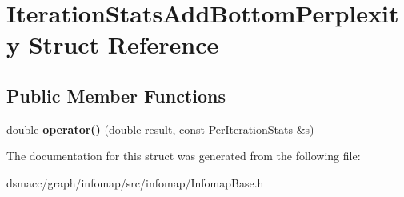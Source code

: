 \hypertarget{structIterationStatsAddBottomPerplexity}{}\section{Iteration\+Stats\+Add\+Bottom\+Perplexity Struct Reference}
\label{structIterationStatsAddBottomPerplexity}
\subsection*{Public Member Functions}
\begin{DoxyCompactItemize}
\item 
\mbox{\label{structIterationStatsAddBottomPerplexity_a26080c94aaecb0580364a8b902a0e9cc}} 
double {\bfseries operator()} (double result, const \mbox{\hyperlink{structPerIterationStats}{Per\+Iteration\+Stats}} \&s)
\end{DoxyCompactItemize}


The documentation for this struct was generated from the following file\+:\begin{DoxyCompactItemize}
\item 
dsmacc/graph/infomap/src/infomap/Infomap\+Base.\+h\end{DoxyCompactItemize}
